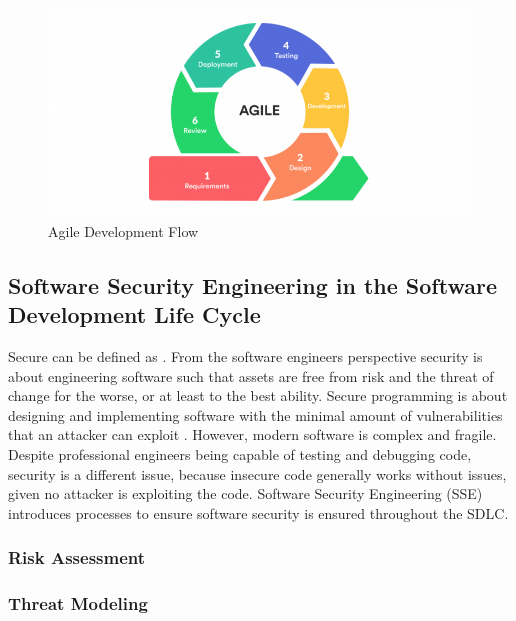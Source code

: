 \begin{figure}
    \centering
    \includegraphics[width=\textwidth]{../../img/chapter_2/agile-dev.png}
    \caption{Agile Development Flow}
    \label{fig:agile-dev}
\end{figure}

\subsection{Software Security Engineering in the Software Development Life Cycle}
Secure can be defined as . From the software engineers perspective security is about engineering software such that assets are free from risk and the threat of change for the worse, or at least to the best ability. Secure programming is about designing and implementing software with the minimal amount of vulnerabilities that an attacker can exploit \cite{helfrich2019securitya}. However, modern software is complex and fragile. Despite professional engineers being capable of testing and debugging code, security is a different issue, because insecure code generally works without issues, given no attacker is exploiting the code. Software Security Engineering (SSE) introduces processes to ensure software security is ensured throughout the SDLC. 

\subsubsection{Risk Assessment}

\subsubsection{Threat Modeling}
